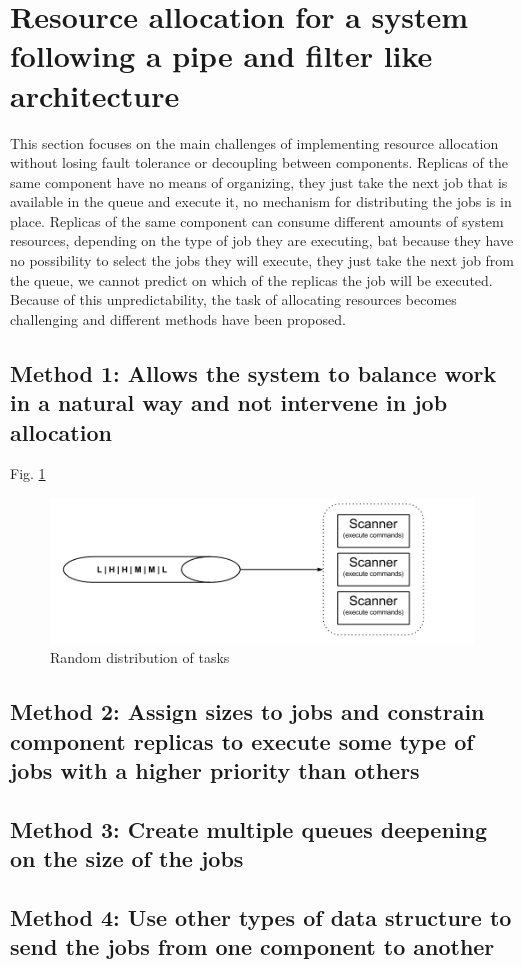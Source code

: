 \section{Resource allocation for a system following a pipe and filter like architecture}
This section focuses on the main challenges of implementing resource allocation without losing fault tolerance or decoupling between components. Replicas of the same component have no means of organizing, they just take the next job that is available in the queue and execute it, no mechanism for distributing the jobs is in place. Replicas of the same component can consume different amounts of system resources, depending on the type of job they are executing, bat because they have no possibility to select the jobs they will execute, they just take the next job from the queue, we cannot predict on which of the replicas the job will be executed. Because of this unpredictability, the task of allocating resources becomes challenging and different methods have been proposed.

\subsection{Method 1: Allows the system to balance work in a natural way and not intervene in job allocation}
Fig. \ref{fig:randomDIstributionsOfTasks}

\begin{figure}[ht]
\centering
\includegraphics[width=\linewidth]{./img/1_NaturalLoadBalancing.png}
\caption{Random distribution of tasks}
\label{fig:randomDIstributionsOfTasks}
\end{figure}

\subsection{Method 2: Assign sizes to jobs and constrain component replicas to execute some type of jobs with a higher priority than others}

\subsection{Method 3: Create multiple queues deepening on the size of the jobs}

\subsection{Method 4: Use other types of data structure to send the jobs from one component to another}
